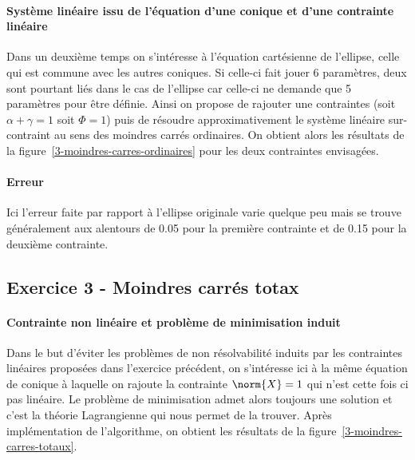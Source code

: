 \paragraph{Système linéaire issu de l'équation d'une conique et d'une contrainte linéaire}
Dans un deuxième temps on s'intéresse à l'équation cartésienne de l'ellipse, celle qui est commune avec les autres coniques. Si celle-ci fait jouer 6 paramètres, deux sont pourtant liés dans le cas de l'ellipse car celle-ci ne demande que 5 paramètres pour être définie. Ainsi on propose de rajouter une contraintes (soit $\alpha + \gamma = 1$ soit $\Phi = 1$) puis de résoudre approximativement le système linéaire sur-contraint au sens des moindres carrés ordinaires. On obtient alors les résultats de la figure~\ref{3-moindres-carres-ordinaires} pour les deux contraintes envisagées.

\begin{figure}
\end{figure}

\paragraph{Erreur}
Ici l'erreur faite par rapport à l'ellipse originale varie quelque peu mais se trouve généralement aux alentours de 0.05 pour la première contrainte et de 0.15 pour la deuxième contrainte.

\subsection{Exercice 3 - Moindres carrés totax}
\paragraph{Contrainte non linéaire et problème de minimisation induit}
Dans le but d'éviter les problèmes de non résolvabilité induits par les contraintes linéaires proposées dans l'exercice précédent, on s'intéresse ici à la même équation de conique à laquelle on rajoute la contrainte $\norm{X} = 1$ qui n'est cette fois ci pas linéaire. Le problème de minimisation admet alors toujours une solution et c'est la théorie Lagrangienne qui nous permet de la trouver. Après implémentation de l'algorithme, on obtient les résultats de la figure~\ref{3-moindres-carres-totaux}.

\begin{figure}
\end{figure}

